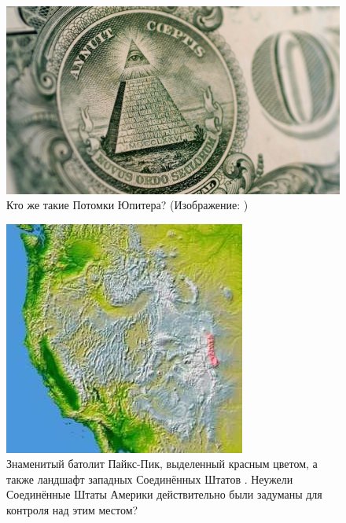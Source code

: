 \documentclass[10pt,twocolumn,letterpaper]{article}
\begin{document}
\begin{figure}[t]
\begin{center}

\includegraphics[width=1\linewidth]{illuminati.jpg}
\end{center}
   \caption{Кто же такие Потомки Юпитера? (Изображение: \cite{35})}
\label{fig:10}
\label{fig:onecol}
\end{figure}

\begin{figure}[t]
\begin{center}
   \includegraphics[width=1\linewidth]{pike.jpg}
\end{center}
   \caption{Знаменитый батолит Пайкс-Пик, выделенный красным цветом, а также ландшафт западных Соединённых Штатов \cite{36}. Неужели Соединённые Штаты Америки действительно были задуманы для контроля над этим местом?}
\label{fig:11}
\label{fig:onecol}
\end{figure}
\end{document}
